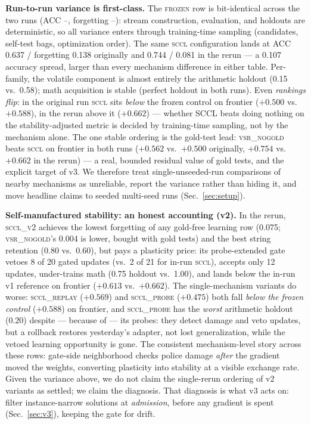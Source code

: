 \documentclass[10pt,conference]{IEEEtran}
\newcommand{\frozenacc}{--}\newcommand{\frozenbwt}{--}\newcommand{\frozenfwt}{--}%
\newcommand{\frozenforget}{--}\newcommand{\frozenupdates}{--}\newcommand{\frozenrollbacks}{--}\newcommand{\frozenfrontier}{--}%
\begin{document}
\textbf{Run-to-run variance is first-class.} The \textsc{frozen} row is bit-identical across the two runs (ACC \frozenacc, forgetting \frozenforget): stream construction, evaluation, and holdouts are deterministic, so all variance enters through training-time sampling (candidates, self-test bags, optimization order). The same \textsc{sccl} configuration lands at ACC 0.637 / forgetting 0.138 originally and 0.744 / 0.081 in the rerun --- a 0.107 accuracy spread, larger than every mechanism difference in either table. Per-family, the volatile component is almost entirely the arithmetic holdout (0.15 vs.\ 0.58); math acquisition is stable (perfect holdout in both runs). Even \emph{rankings flip}: in the original run \textsc{sccl} sits \emph{below} the frozen control on frontier ($+0.500$ vs.\ $+0.588$), in the rerun above it ($+0.662$) --- whether SCCL beats doing nothing on the stability-adjusted metric is decided by training-time sampling, not by the mechanism alone. The one stable ordering is the gold-test lead: \textsc{vsr\_nogold} beats \textsc{sccl} on frontier in both runs ($+0.562$ vs.\ $+0.500$ originally, $+0.754$ vs.\ $+0.662$ in the rerun) --- a real, bounded residual value of gold tests, and the explicit target of v3. We therefore treat single-unseeded-run comparisons of nearby mechanisms as unreliable, report the variance rather than hiding it, and move headline claims to seeded multi-seed runs (Sec.~\ref{sec:setup}).

\textbf{Self-manufactured stability: an honest accounting (v2).} In the rerun, \textsc{sccl\_v2} achieves the lowest forgetting of any gold-free learning row (0.075; \textsc{vsr\_nogold}'s 0.004 is lower, bought with gold tests) and the best string retention (0.80 vs.\ 0.60), but pays a plasticity price: its probe-extended gate vetoes 8 of 20 gated updates (vs.\ 2 of 21 for in-run \textsc{sccl}), accepts only 12 updates, under-trains math (0.75 holdout vs.\ 1.00), and lands below the in-run v1 reference on frontier ($+0.613$ vs.\ $+0.662$). The single-mechanism variants do worse: \textsc{sccl\_replay} ($+0.569$) and \textsc{sccl\_probe} ($+0.475$) both fall \emph{below the frozen control} ($+0.588$) on frontier, and \textsc{sccl\_probe} has the \emph{worst} arithmetic holdout (0.20) despite --- because of --- its probes: they detect damage and veto updates, but a rollback restores yesterday's adapter, not lost generalization, while the vetoed learning opportunity is gone. The consistent mechanism-level story across these rows: gate-side neighborhood checks police damage \emph{after} the gradient moved the weights, converting plasticity into stability at a visible exchange rate. Given the variance above, we do not claim the single-rerun ordering of v2 variants as settled; we claim the diagnosis. That diagnosis is what v3 acts on: filter instance-narrow solutions at \emph{admission}, before any gradient is spent (Sec.~\ref{sec:v3}), keeping the gate for drift.
\end{document}
